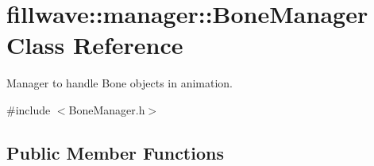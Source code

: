 \hypertarget{classfillwave_1_1manager_1_1BoneManager}{}\section{fillwave\+:\+:manager\+:\+:Bone\+Manager Class Reference}
\label{classfillwave_1_1manager_1_1BoneManager}


Manager to handle Bone objects in animation.  




{\ttfamily \#include $<$Bone\+Manager.\+h$>$}

\subsection*{Public Member Functions}
